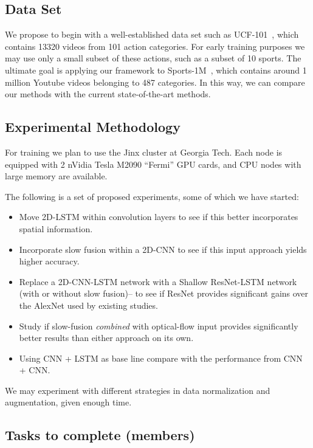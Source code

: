 \subsection*{Data Set}
We propose to begin with a well-established data set such as UCF-101~\cite{ucf101}, which contains 13320 videos from 101 action categories. For early training purposes we may use only a small subset of these actions, such as a subset of 10 sports. The ultimate goal is applying our framework to Sports-1M~\cite{cnnvid}, which contains around 1 million Youtube videos belonging to 487 categories. In this way, we can compare our methods with the current state-of-the-art methods.

\subsection*{Experimental Methodology}
For training we plan to use the Jinx cluster at Georgia Tech. Each node is equipped with 2 nVidia Tesla M2090 ``Fermi'' GPU cards, and CPU nodes with large memory are available.

The following is a set of proposed experiments, some of which we have started:
\begin{itemize}
\item Move 2D-LSTM within convolution layers to see if this better incorporates spatial information.
\item Incorporate slow fusion within a 2D-CNN to see if this input approach yields higher accuracy.
\item Replace a 2D-CNN-LSTM network with a Shallow ResNet-LSTM network (with or without slow fusion)-- to see if ResNet provides significant gains over the AlexNet used by existing studies.
\item Study if slow-fusion \emph{combined} with optical-flow input provides significantly better results than either approach on its own.
\item Using CNN + LSTM as base line compare with the performance from CNN + CNN.

\end{itemize}
We may experiment with different strategies in data normalization and augmentation, given enough time.

\subsection*{Tasks to complete (members)}


